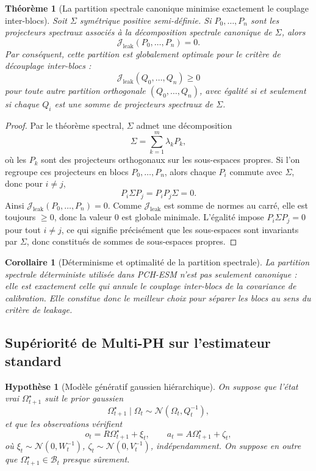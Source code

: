 \documentclass[11pt,a4paper]{article}
\newtheorem{assumption}{Hypothèse}[section]
\newtheorem{theorem}{Théorème}[section]
\newtheorem{corollary}{Corollaire}[section]
\newcommand{\1}{\mathbf 1}
\begin{document}
\begin{theorem}[La partition spectrale canonique minimise exactement le couplage inter-blocs]
Soit \(\Sigma\) symétrique positive semi-définie.  
Si \(P_0,\dots,P_n\) sont les projecteurs spectraux associés à la décomposition spectrale canonique de \(\Sigma\),
alors
\[
\mathcal J_{\mathrm{leak}}(P_0,\dots,P_n)=0.
\]
Par conséquent, cette partition est globalement optimale pour le critère de découplage inter-blocs :
\[
\mathcal J_{\mathrm{leak}}(Q_0,\dots,Q_n)\ge 0
\]
pour toute autre partition orthogonale \((Q_0,\dots,Q_n)\), avec égalité si et seulement si chaque \(Q_i\) est une somme de projecteurs spectraux de \(\Sigma\).
\end{theorem}

\begin{proof}
Par le théorème spectral, \(\Sigma\) admet une décomposition
\[
\Sigma=\sum_{k=1}^m \lambda_k P_k,
\]
où les \(P_k\) sont des projecteurs orthogonaux sur les sous-espaces propres.  
Si l'on regroupe ces projecteurs en blocs \(P_0,\dots,P_n\), alors chaque \(P_i\) commute avec \(\Sigma\), donc pour \(i\neq j\),
\[
P_i\Sigma P_j
=
P_iP_j\Sigma
=
0.
\]
Ainsi \(\mathcal J_{\mathrm{leak}}(P_0,\dots,P_n)=0\).  
Comme \(\mathcal J_{\mathrm{leak}}\) est somme de normes au carré, elle est toujours \(\ge 0\), donc la valeur \(0\) est globale minimale.  
L'égalité impose \(P_i\Sigma P_j=0\) pour tout \(i\neq j\), ce qui signifie précisément que les sous-espaces sont invariants par \(\Sigma\), donc constitués de sommes de sous-espaces propres.
\end{proof}

\begin{corollary}[Déterminisme et optimalité de la partition spectrale]
La partition spectrale déterministe utilisée dans PCH-ESM n'est pas seulement canonique :
elle est exactement celle qui annule le couplage inter-blocs de la covariance de calibration.
Elle constitue donc le meilleur choix pour séparer les blocs au sens du critère de leakage.
\end{corollary}

\subsection{Supériorité de Multi-PH sur l'estimateur standard}

\begin{assumption}[Modèle génératif gaussien hiérarchique]
On suppose que l'état vrai \(\Omega_{t+1}^\star\) suit le prior gaussien
\[
\Omega_{t+1}^\star \mid \Omega_t \sim \mathcal N(\Omega_t,Q_t^{-1}),
\]
et que les observations vérifient
\[
o_t = R\Omega_{t+1}^\star + \xi_t,
\qquad
a_t = A\Omega_{t+1}^\star + \zeta_t,
\]
où \(\xi_t\sim\mathcal N(0,W_t^{-1})\), \(\zeta_t\sim\mathcal N(0,V_t^{-1})\), indépendamment.
On suppose en outre que \(\Omega_{t+1}^\star\in\mathcal B_t\) presque sûrement.
\end{assumption}
\end{document}
